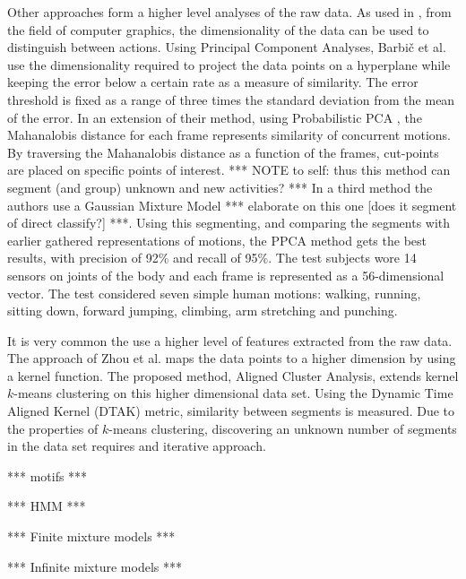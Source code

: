Other approaches form a higher level analyses of the raw data.
As used in \cite{barbivc2004segmenting}, from the field of computer graphics, the dimensionality of the data can be used to distinguish between actions.
Using Principal Component Analyses, Barbi{\v{c}} et al. use the dimensionality required to project the data points on a hyperplane while keeping the error below a certain rate as a measure of similarity.
The error threshold is fixed as a range of three times the standard deviation from the mean of the error.
In an extension of their method, using Probabilistic PCA \cite{tipping1999probabilistic}, the Mahanalobis distance \cite{duda1995pattern} for each frame represents similarity of concurrent motions.
By traversing the Mahanalobis distance as a function of the frames, cut-points are placed on specific points of interest.
*** NOTE to self: thus this method can segment (and group) unknown and new activities? ***
In a third method the authors use a Gaussian Mixture Model *** elaborate on this one [does it segment of direct classify?] ***.
Using this segmenting, and comparing the segments with earlier gathered representations of motions, the PPCA method gets the best results, with precision of 92\% and recall of 95\%.
The test subjects wore 14 sensors on joints of the body and each frame is represented as a 56-dimensional vector.
The test considered seven simple human motions: walking, running, sitting down, forward jumping, climbing, arm stretching and punching.

It is very common the use a higher level of features extracted from the raw data.
The approach of Zhou et al. \cite{zhou2008aligned} maps the data points to a higher dimension by using a kernel function.
The proposed method, Aligned Cluster Analysis, extends kernel $k$-means clustering on this higher dimensional data set.
Using the Dynamic Time Aligned Kernel (DTAK) metric, similarity between segments is measured.
Due to the properties of $k$-means clustering, discovering an unknown number of segments in the data set requires and iterative approach.


*** motifs ***


*** HMM ***

*** Finite mixture models ***

*** Infinite mixture models ***


